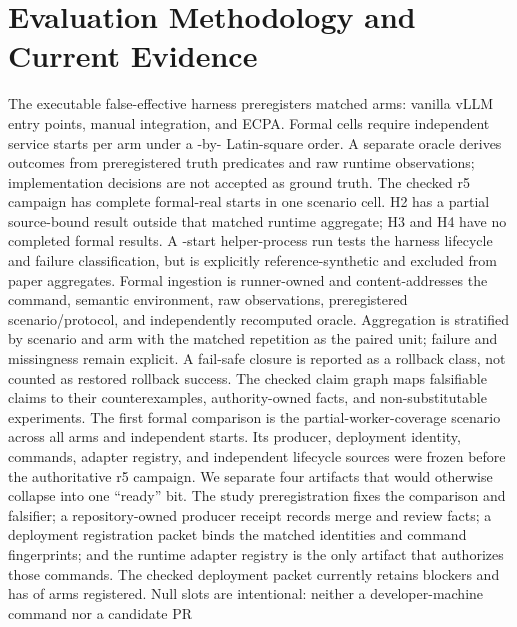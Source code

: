 \documentclass[letterpaper,twocolumn,10pt]{article}
\begin{document}
\section{Evaluation Methodology and Current Evidence}
\label{sec:evaluation}
The executable false-effective harness preregisters \ECPAFormalArms{} matched arms:
vanilla vLLM entry points, manual integration, and ECPA.  Formal cells require
\ECPAMinimumStarts{} independent service starts per arm under a
\ECPAScheduleRows{}-by-\ECPAFormalArms{} Latin-square order.  A separate oracle
derives outcomes from preregistered truth predicates
and raw runtime observations; implementation decisions are not accepted as
ground truth.  The checked r5 campaign has \ECPAFormalStarts{} complete
formal-real starts in one scenario cell.  H2 has a partial source-bound result
outside that matched runtime aggregate; H3 and H4 have no completed formal results.  A
\ECPAReferenceStarts{}-start helper-process run tests the
harness lifecycle and failure classification, but is explicitly
reference-synthetic and excluded from paper aggregates.  Formal ingestion is
runner-owned and content-addresses the command, semantic environment, raw
observations, preregistered scenario/protocol, and independently recomputed
oracle.  Aggregation is stratified by scenario and arm with the matched
repetition as the paired unit; failure and missingness remain explicit.  A
fail-safe closure is reported as a rollback class, not counted as restored
rollback success.
The checked claim graph maps \ECPAResearchClaims{} falsifiable claims to their
counterexamples, authority-owned facts, and non-substitutable experiments.
The first formal comparison is the partial-worker-coverage scenario across all
\ECPAFormalArms{} arms and \ECPAFirstStudyStarts{} independent starts.  Its
producer, deployment identity, commands, adapter registry, and
\ECPAFormalLifecycleSources{} independent lifecycle sources were frozen before
the authoritative r5 campaign.
We separate four artifacts that would otherwise collapse into one ``ready''
bit.  The study preregistration fixes the comparison and falsifier; a
repository-owned producer receipt records merge and review facts; a deployment
registration packet binds the matched identities and command fingerprints; and
the runtime adapter registry is the only artifact that authorizes those
commands.  The checked deployment packet currently retains
\ECPADeploymentBlockers{} blockers and has
\ECPARegisteredDeploymentArms{} of \ECPAFormalArms{} arms registered.  Null
slots are intentional: neither a developer-machine command nor a candidate PR
\end{document}
